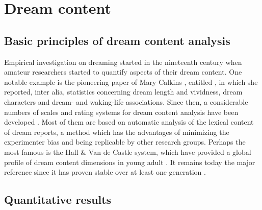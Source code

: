 %
\chapter{Dream content}
\label{sec:dream-content}


\section{Basic principles of dream content analysis}
\label{sec:dream-content:method}

Empirical investigation on dreaming started in the nineteenth century when amateur researchers started to quantify aspects of their dream content. One notable example is the pioneering paper of Mary Calkins \citeyearpar{calkins_statistics_1893}, entitled , in which she reported, inter alia, statistics concerning dream length and vividness, dream characters and dream- and waking-life associations. Since then, a considerable numbers of scales and rating systems for dream content analysis have been developed \citep{schredl_dream_2010}. Most of them are based on automatic analysis of the lexical content of dream reports, a method which has the advantages of minimizing the experimenter bias and being replicable by other research groups. Perhaps the most famous is the Hall \& Van de Castle system, which have provided a global profile of dream content dimensions in young adult \citep{hall_content_1966}. It remains today the major reference since it has proven stable over at least one generation \citep{hall_dreams_1982}.

\section{Quantitative results}
\label{sec:dream-content:quant}

